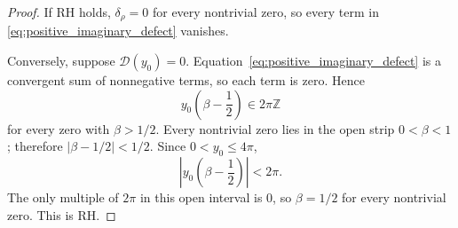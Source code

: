 \documentclass[11pt]{amsart}
\numberwithin{equation}{section}
\theoremstyle{definition}
\theoremstyle{remark}
\begin{document}
\begin{proof}
If RH holds, $\delta_\rho=0$ for every nontrivial zero, so every term in \eqref{eq:positive_imaginary_defect} vanishes.

Conversely, suppose $\mathcal D(y_0)=0$. Equation~\eqref{eq:positive_imaginary_defect} is a convergent sum of nonnegative terms, so each term is zero. Hence
\begin{equation}\label{eq:cosine_zero_condition}
y_0\left(\beta-\frac12\right)\in2\pi\mathbb Z
\end{equation}
for every zero with $\beta>1/2$. Every nontrivial zero lies in the open strip $0<\beta<1$ \cite{Titchmarsh1986,DLMF}; therefore $|\beta-1/2|<1/2$. Since $0<y_0\le4\pi$,
\begin{equation}\label{eq:cosine_zero_range}
\left|y_0\left(\beta-\frac12\right)\right|<2\pi.
\end{equation}
The only multiple of $2\pi$ in this open interval is $0$, so $\beta=1/2$ for every nontrivial zero. This is RH.
\end{proof}
\end{document}
